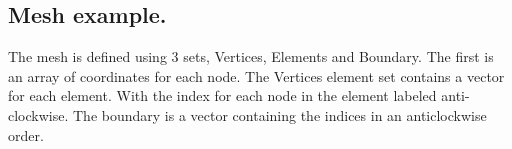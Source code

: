 \documentclass{article}
\begin{document}




\subsection{Mesh example.}
The mesh is defined using 3 sets, Vertices, Elements and Boundary. The first is an array of coordinates for each node. The Vertices element set contains a vector for each element. With the index for each node in the element labeled anti-clockwise. The boundary is a vector containing the indices in an anticlockwise order.



%
\end{document}
